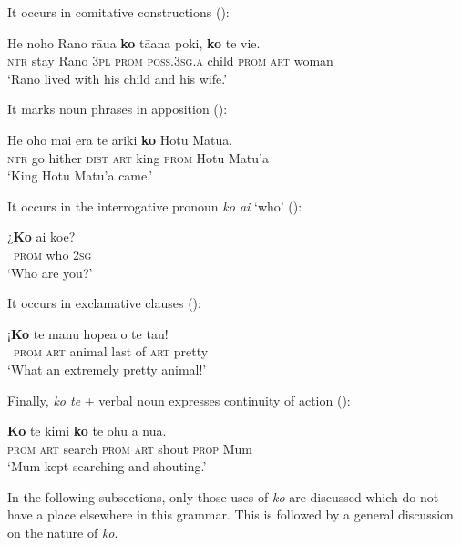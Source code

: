 It occurs in comitative constructions ():

\ea\label{ex:4.315}
\gll He noho Rano rāua \textbf{ko} tā{\ꞌ}ana poki, \textbf{ko} te vi{\ꞌ}e.\\
\textsc{ntr} stay Rano \textsc{3pl} \textsc{prom} \textsc{poss.3sg.a} child \textsc{prom} \textsc{art} woman\\

\glt
‘Rano lived with his child and his wife.’ \textstyleExampleref{[Mtx-7-18.001]}
\z

It marks noun phrases in apposition ():

\ea\label{ex:4.316}
\gll He oho mai era te {\ꞌ}ariki \textbf{ko} Hotu Matu{\ꞌ}a. \\
\textsc{ntr} go hither \textsc{dist} \textsc{art} king \textsc{prom} Hotu Matu’a \\

\glt
‘King Hotu Matu’a came.’ \textstyleExampleref{[Mtx-2-02.043]}
\z

It occurs in the interrogative pronoun \textit{ko ai} ‘who’ ():

\ea\label{ex:4.317}
\gll ¿\textbf{Ko} ai koe? \\
~\textsc{prom} who \textsc{2sg} \\

\glt
‘Who are you?’ \textstyleExampleref{[R304.097]} 
\z

It occurs in exclamative clauses ():

\ea\label{ex:4.318}
\gll ¡\textbf{Ko} te manu hope{\ꞌ}a o te tau! \\
~\textsc{prom} \textsc{art} animal last of \textsc{art} pretty \\

\glt
‘What an extremely pretty animal!’ \textstyleExampleref{[R345.072]} 
\z

Finally, \textit{ko te} + verbal noun expresses continuity of action ():

\ea\label{ex:4.319}
\gll \textbf{Ko} te kimi \textbf{ko} te ohu a nua. \\
\textsc{prom} \textsc{art} search \textsc{prom} \textsc{art} shout \textsc{prop} Mum \\

\glt
‘Mum kept searching and shouting.’ \textstyleExampleref{[R236.082]} 
\z

In the following subsections, only those uses of \textit{ko} are discussed which do not have a place elsewhere in this grammar. This is followed by a general discussion on the nature of \textit{ko}.

